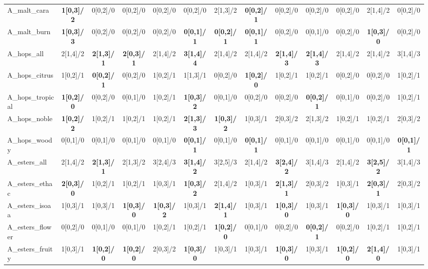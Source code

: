 \begin{landscape}
\begin{longtable}{lcccccccccccc}
A\_malt\_cara & \textbf{1[0,3]/2} & 0[0,2]/0 & 0[0,2]/0 & 0[0,2]/0 & 0[0,2]/0 & 2[1,3]/2 & \textbf{0[0,2]/1} & 0[0,2]/0 & 0[0,2]/0 & 0[0,2]/0 & 2[1,4]/2 & 0[0,2]/0 \\
A\_malt\_burn & \textbf{1[0,3]/3} & 0[0,2]/0 & 0[0,2]/0 & 0[0,2]/0 & \textbf{0[0,1]/1} & \textbf{0[0,2]/1} & \textbf{0[0,1]/1} & 0[0,2]/0 & 0[0,1]/0 & 0[0,2]/0 & \textbf{1[0,3]/0} & 0[0,2]/0 \\
A\_hops\_all & 2[1,4]/2 & \textbf{2[1,3]/1} & \textbf{2[0,3]/1} & 2[1,4]/2 & \textbf{3[1,4]/4} & 2[1,4]/2 & 2[1,4]/2 & \textbf{2[1,4]/3} & \textbf{2[1,4]/3} & 2[1,4]/2 & 2[1,4]/2 & 3[1,4]/3 \\
A\_hops\_citrus & 1[0,2]/1 & \textbf{0[0,2]/1} & 0[0,2]/0 & 1[0,2]/1 & 1[1,3]/1 & 0[0,2]/0 & \textbf{1[0,2]/0} & 1[0,2]/1 & 1[0,2]/1 & 0[0,2]/0 & 0[0,2]/0 & 1[0,2]/1 \\
A\_hops\_tropical & \textbf{1[0,2]/0} & 0[0,2]/0 & 0[0,1]/0 & 1[0,2]/1 & \textbf{1[0,3]/2} & 0[0,1]/0 & 0[0,2]/0 & 0[0,2]/0 & \textbf{0[0,2]/1} & 0[0,1]/0 & 0[0,2]/0 & 1[0,2]/1 \\
A\_hops\_noble & \textbf{1[0,2]/2} & 1[0,2]/1 & 1[0,2]/1 & 1[0,2]/1 & \textbf{2[1,3]/3} & \textbf{1[0,3]/2} & 1[0,3]/1 & 2[0,3]/2 & 2[1,3]/2 & 1[0,2]/1 & 1[0,2]/1 & 2[0,3]/2 \\
A\_hops\_woody & 0[0,1]/0 & 0[0,1]/0 & 0[0,1]/0 & 0[0,1]/0 & \textbf{0[0,1]/1} & 0[0,1]/0 & \textbf{0[0,1]/1} & 0[0,1]/0 & 0[0,1]/0 & 0[0,1]/0 & 0[0,1]/0 & \textbf{0[0,1]/1} \\
A\_esters\_all & 2[1,4]/2 & \textbf{2[1,3]/1} & 2[1,3]/2 & 3[2,4]/3 & \textbf{3[1,4]/2} & 3[2,5]/3 & 2[1,4]/2 & \textbf{3[2,4]/2} & 3[1,4]/3 & 2[1,4]/2 & \textbf{3[2,5]/2} & 3[1,4]/3 \\
A\_esters\_ethac & \textbf{2[0,3]/0} & 1[0,2]/1 & 1[0,2]/1 & 1[0,3]/1 & \textbf{1[0,3]/2} & 2[1,4]/2 & 1[0,3]/1 & \textbf{2[1,3]/1} & 2[0,3]/2 & 1[0,3]/1 & \textbf{2[0,3]/1} & 2[0,3]/2 \\
A\_esters\_isoaa & 1[0,3]/1 & 1[0,3]/1 & \textbf{1[0,3]/0} & \textbf{1[0,3]/2} & 1[0,3]/1 & \textbf{2[1,4]/1} & 1[0,3]/1 & \textbf{1[0,3]/0} & 1[0,3]/1 & \textbf{1[0,3]/0} & 1[0,3]/1 & 1[0,3]/1 \\
A\_esters\_flower & 0[0,2]/0 & 0[0,1]/0 & 0[0,1]/0 & 1[0,2]/1 & 1[0,2]/1 & \textbf{1[0,2]/0} & 0[0,1]/0 & 0[0,2]/0 & \textbf{0[0,2]/1} & 0[0,2]/0 & 1[0,2]/1 & 1[0,2]/1 \\
A\_esters\_fruity & 1[0,3]/1 & \textbf{1[0,2]/0} & \textbf{1[0,2]/0} & 2[0,3]/2 & \textbf{1[0,3]/0} & 1[0,3]/1 & 1[0,3]/1 & \textbf{1[0,3]/0} & 1[0,3]/1 & \textbf{1[0,2]/0} & \textbf{2[1,4]/0} & 1[0,3]/1 \\
\end{longtable}
\end{landscape}

